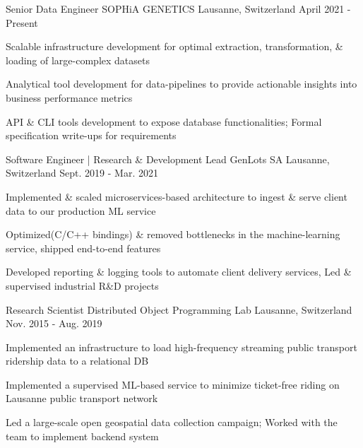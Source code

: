 

\begin{cventries}

	
 \cventry
    {Senior Data Engineer} %
    {SOPHiA GENETICS} %
    {Lausanne, Switzerland} %
    {April 2021 - Present} %
    {
      \begin{cvitems} %
        \item {Scalable infrastructure development for optimal extraction, transformation, \& loading of large-complex datasets}
        \item {Analytical tool development for data-pipelines to provide actionable insights into business performance metrics}
        \item {API \& CLI tools development to expose database functionalities; Formal specification write-ups for requirements}
      \end{cvitems}
    }

  \cventry
    {Software Engineer | Research \& Development Lead} %
    {GenLots SA} %
    {Lausanne, Switzerland} %
    {Sept. 2019 - Mar. 2021} %
    {
      \begin{cvitems} %
      	\item {Implemented \& scaled microservices-based architecture to ingest \& serve client data to our production ML service}
      	\item {Optimized(C/C++ bindings) \& removed bottlenecks in the machine-learning service, shipped end-to-end features}
        \item {Developed reporting \& logging tools to automate client delivery services, Led \& supervised industrial R\&D projects}
      \end{cvitems}
    } 
   

  \cventry
    {Research Scientist} %
    {Distributed Object Programming Lab} %
    {Lausanne, Switzerland} %
    {Nov. 2015 - Aug. 2019} %
    {
      \begin{cvitems} %
      	\item {Implemented an infrastructure to load high-frequency streaming public transport ridership data to a relational DB}
      	\item {Implemented a supervised ML-based service to minimize ticket-free riding on Lausanne public transport network}
        \item {Led a large-scale open geospatial data collection campaign; Worked with the team to implement backend system}
      \end{cvitems}
    }



\end{cventries}

